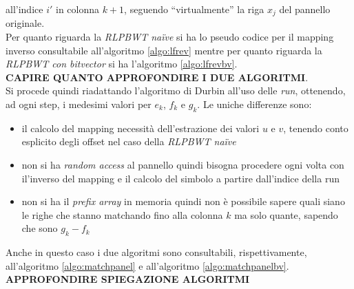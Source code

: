 all'indice $i'$ in colonna $k+1$, seguendo ``virtualmente'' la riga $x_j$ del
pannello originale.\\
Per quanto riguarda la \textit{RLPBWT na\"{i}ve} si ha lo pseudo codice per il
mapping inverso consultabile all'algoritmo \ref{algo:lfrev} mentre per quanto
riguarda la \textit{RLPBWT con bitvector} si ha l'algoritmo
\ref{algo:lfrevbv}.\\
\textbf{CAPIRE QUANTO APPROFONDIRE I DUE ALGORITMI}.\\
Si procede quindi riadattando l'algoritmo di Durbin all'uso delle \textit{run},
ottenendo, ad ogni step, i medesimi valori per $e_k$, $f_k$ e $g_k$. Le uniche
differenze sono:
\begin{itemize}
  \item il calcolo del mapping necessità dell'estrazione dei valori $u$ e $v$,
  tenendo conto esplicito degli offset nel caso della \textit{RLPBWT na\"{i}ve}
  \item non si ha \textit{random access} al pannello quindi bisogna procedere
  ogni volta con il'inverso del mapping e il calcolo del simbolo a partire
  dall'indice della run
  \item non si ha il \textit{prefix array} in memoria quindi non è possibile
  sapere quali siano le righe che stanno matchando fino alla colonna $k$ ma solo
  quante, sapendo che sono $g_k-f_k$
\end{itemize}
Anche in questo caso i due algoritmi sono consultabili, rispettivamente,
all'algoritmo \ref{algo:matchpanel} e all'algoritmo \ref{algo:matchpanelbv}.\\
\textbf{APPROFONDIRE SPIEGAZIONE ALGORITMI}